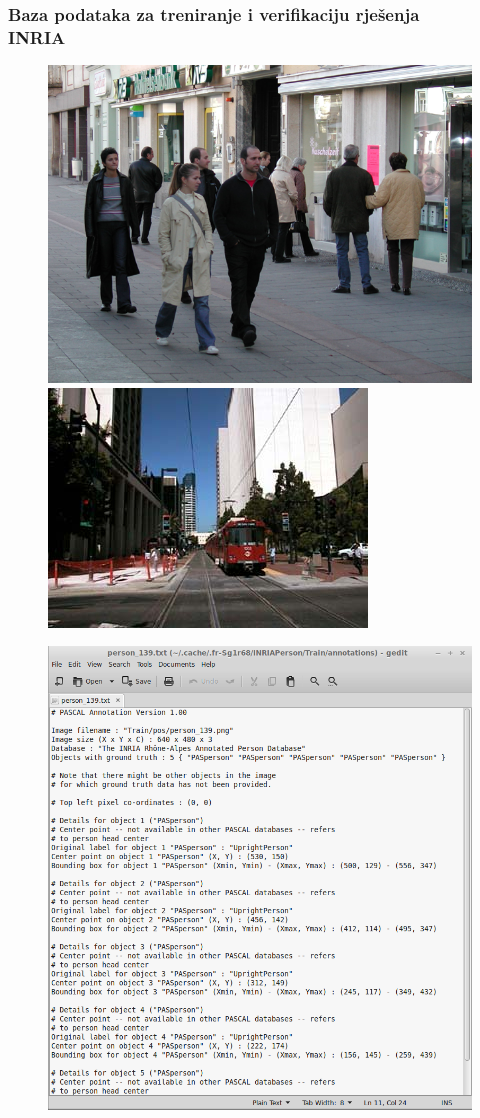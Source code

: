 \documentclass{beamer}
\begin{document}
\begin{frame}
\frametitle{Baza podataka za treniranje i verifikaciju rješenja \\ INRIA}

\begin{figure}
\includegraphics{img/person_139.png}
\includegraphics[scale=0.3]{img/neg.png}
\end{figure}
\begin{figure}
\includegraphics[scale=0.3]{img/annot_139.png}

\end{figure}
\end{frame}
\end{document}
